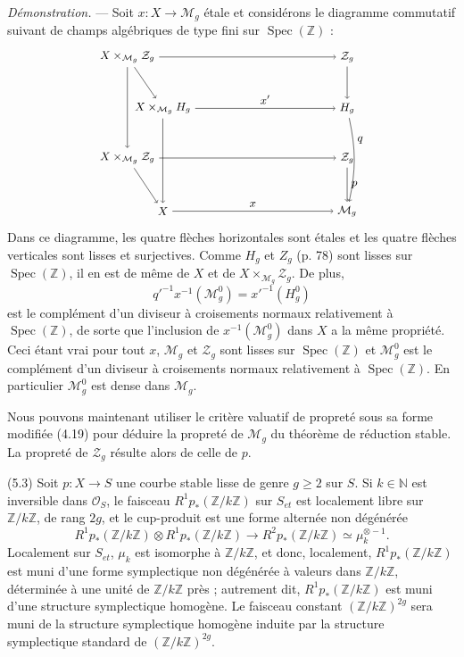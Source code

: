 \documentclass[10pt]{article}
\newcommand{\Spec}{\operatorname{Spec}}
\newcommand{\cO}{\mathcal O}
\begin{document}
\noindent\emph{Démonstration.} --- Soit $x:X\to\mathcal M_g$ étale et considérons le diagramme commutatif suivant de champs algébriques de type fini sur $\Spec(\mathbb Z)$ :
\[
\begin{tikzpicture}[baseline=(current bounding box.center), x=1cm, y=1cm, every node/.style={font=\small}]
\node (A) at (0,3.6) {$X\times_{\mathcal M_g}\mathcal Z_g$};
\node (B) at (6.2,3.6) {$\mathcal Z_g$};
\node (C) at (1.0,2.15) {$X\times_{\mathcal M_g}H_g$};
\node (D) at (6.2,2.15) {$H_g$};
\node (E) at (0,0.75) {$X\times_{\mathcal M_g}\mathcal Z_g$};
\node (F) at (6.2,0.75) {$\mathcal Z_g$};
\node (G) at (1.0,-0.75) {$X$};
\node (H) at (6.2,-0.75) {$\mathcal M_g$};
\draw[->] (A) -- (B);
\draw[->] (C) -- node[above] {$x'$} (D);
\draw[->] (E) -- (F);
\draw[->] (G) -- node[above] {$x$} (H);
\draw[->] (A) -- (E);
\draw[->] (B) -- (D);
\draw[->] (D) to[bend left=12] node[pos=0.25,right] {$q$} (H);
\draw[->] (F) -- node[right] {$p$} (H);
\draw[->] (A) -- (C);
\draw[->] (C) -- (G);
\draw[->] (E) -- (G);
\end{tikzpicture}
\]
Dans ce diagramme, les quatre flèches horizontales sont étales et les quatre flèches verticales sont lisses et surjectives. Comme $H_g$ et $Z_g$ (p. 78) sont lisses sur $\Spec(\mathbb Z)$, il en est de même de $X$ et de $X\times_{\mathcal M_g}\mathcal Z_g$. De plus,
\[
q'^{-1}x^{-1}(\mathcal M_g^0)=x'^{-1}(H_g^0)
\]
est le complément d'un diviseur à croisements normaux relativement à $\Spec(\mathbb Z)$, de sorte que l'inclusion de $x^{-1}(\mathcal M_g^0)$ dans $X$ a la même propriété. Ceci étant vrai pour tout $x$, $\mathcal M_g$ et $\mathcal Z_g$ sont lisses sur $\Spec(\mathbb Z)$ et $\mathcal M_g^0$ est le complément d'un diviseur à croisements normaux relativement à $\Spec(\mathbb Z)$. En particulier $\mathcal M_g^0$ est dense dans $\mathcal M_g$.

Nous pouvons maintenant utiliser le critère valuatif de propreté sous sa forme modifiée (4.19) pour déduire la propreté de $\mathcal M_g$ du théorème de réduction stable. La propreté de $\mathcal Z_g$ résulte alors de celle de $p$.

\medskip
\noindent(5.3) Soit $p:X\to S$ une courbe stable lisse de genre $g\geq2$ sur $S$. Si $k\in\mathbb N$ est inversible dans $\cO_S$, le faisceau $R^1p_*(\mathbb Z/k\mathbb Z)$ sur $S_{et}$ est localement libre sur $\mathbb Z/k\mathbb Z$, de rang $2g$, et le cup-produit est une forme alternée non dégénérée
\[
R^1p_*(\mathbb Z/k\mathbb Z)\otimes R^1p_*(\mathbb Z/k\mathbb Z)
\longrightarrow R^2p_*(\mathbb Z/k\mathbb Z)\simeq\mu_k^{\otimes -1}.
\]
Localement sur $S_{et}$, $\mu_k$ est isomorphe à $\mathbb Z/k\mathbb Z$, et donc, localement, $R^1p_*(\mathbb Z/k\mathbb Z)$ est muni d'une forme symplectique non dégénérée à valeurs dans $\mathbb Z/k\mathbb Z$, déterminée à une unité de $\mathbb Z/k\mathbb Z$ près ; autrement dit, $R^1p_*(\mathbb Z/k\mathbb Z)$ est muni d'une structure symplectique homogène. Le faisceau constant $(\mathbb Z/k\mathbb Z)^{2g}$ sera muni de la structure symplectique homogène induite par la structure symplectique standard de $(\mathbb Z/k\mathbb Z)^{2g}$.
\end{document}
